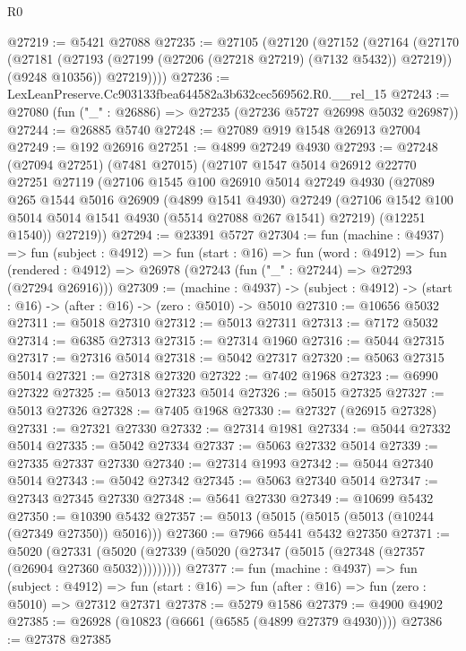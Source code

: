 \begin{lexlean}{R0}
\begin{coremodule}
@27219 := @5421 @27088
@27235 := @27105
    (@27120
      (@27152
        (@27164
          (@27170
            (@27181 (@27193 (@27199 (@27206 (@27218 @27219) (@7132 @5432)) @27219)) (@9248 @10356))
            @27219))))
@27236 := LexLeanPreserve.Cc903133fbea644582a3b632cec569562.R0.__rel_15
@27243 := @27080 (fun ("_" : @26886) => @27235 (@27236 @5727 @26998 @5032 @26987))
@27244 := @26885 @5740
@27248 := @27089 @919 @1548 @26913 @27004
@27249 := @192 @26916
@27251 := @4899 @27249 @4930
@27293 := @27248
    (@27094 @27251)
    (@7481 @27015)
    (@27107
      @1547
      @5014
      @26912
      @22770
      @27251
      @27119
      (@27106
        @1545
        @100
        @26910
        @5014
        @27249
        @4930
        (@27089
          @265
          @1544
          @5016
          @26909
          (@4899 @1541 @4930)
          @27249
          (@27106 @1542 @100 @5014 @5014 @1541 @4930 (@5514 @27088 @267 @1541) @27219)
          (@12251 @1540))
        @27219))
@27294 := @23391 @5727
@27304 := fun (machine : @4937) =>
  fun (subject : @4912) =>
  fun (start : @16) =>
  fun (word : @4912) =>
  fun (rendered : @4912) => @26978 (@27243 (fun ("_" : @27244) => @27293 (@27294 @26916)))
@27309 := (machine : @4937) ->
  (subject : @4912) -> (start : @16) -> (after : @16) -> (zero : @5010) -> @5010
@27310 := @10656 @5032
@27311 := @5018 @27310
@27312 := @5013 @27311
@27313 := @7172 @5032
@27314 := @6385 @27313
@27315 := @27314 @1960
@27316 := @5044 @27315
@27317 := @27316 @5014
@27318 := @5042 @27317
@27320 := @5063 @27315 @5014
@27321 := @27318 @27320
@27322 := @7402 @1968
@27323 := @6990 @27322
@27325 := @5013 @27323 @5014
@27326 := @5015 @27325
@27327 := @5013 @27326
@27328 := @7405 @1968
@27330 := @27327 (@26915 @27328)
@27331 := @27321 @27330
@27332 := @27314 @1981
@27334 := @5044 @27332 @5014
@27335 := @5042 @27334
@27337 := @5063 @27332 @5014
@27339 := @27335 @27337 @27330
@27340 := @27314 @1993
@27342 := @5044 @27340 @5014
@27343 := @5042 @27342
@27345 := @5063 @27340 @5014
@27347 := @27343 @27345 @27330
@27348 := @5641 @27330
@27349 := @10699 @5432
@27350 := @10390 @5432
@27357 := @5013 (@5015 (@5015 (@5013 (@10244 (@27349 @27350)) @5016)))
@27360 := @7966 @5441 @5432 @27350
@27371 := @5020
    (@27331 (@5020 (@27339 (@5020 (@27347 (@5015 (@27348 (@27357 (@26904 @27360 @5032)))))))))
@27377 := fun (machine : @4937) =>
  fun (subject : @4912) =>
  fun (start : @16) => fun (after : @16) => fun (zero : @5010) => @27312 @27371
@27378 := @5279 @1586
@27379 := @4900 @4902
@27385 := @26928 (@10823 (@6661 (@6585 (@4899 @27379 @4930))))
@27386 := @27378 @27385

\end{coremodule}
\end{lexlean}
